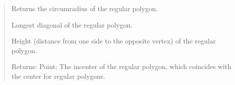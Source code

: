 \documentclass[letterpaper,10pt,english]{sphinxmanual}
\begin{document}
\begin{quote}
\begin{fulllineitems}
\begin{fulllineitems}
\end{fulllineitems}


\begin{fulllineitems}
\label{\detokenize{pygeox:pygeox.custom_objects.RegularPolygon.circumradius}}
\pysigstartsignatures
\pysigline
{}
\pysigstopsignatures
\sphinxAtStartPar
Returns the circumradius of the regular polygon.

\end{fulllineitems}


\begin{fulllineitems}
\label{\detokenize{pygeox:pygeox.custom_objects.RegularPolygon.diagonal}}
\pysigstartsignatures
\pysigline
{}
\pysigstopsignatures
\sphinxAtStartPar
Longest diagonal of the regular polygon.

\end{fulllineitems}


\begin{fulllineitems}
\label{\detokenize{pygeox:pygeox.custom_objects.RegularPolygon.height}}
\pysigstartsignatures
\pysigline
{}
\pysigstopsignatures
\sphinxAtStartPar
Height (distance from one side to the opposite vertex) of the regular polygon.

\end{fulllineitems}


\begin{fulllineitems}
\label{\detokenize{pygeox:pygeox.custom_objects.RegularPolygon.incenter}}
\pysigstartsignatures
\pysigline
{}
\pysigstopsignatures
\sphinxAtStartPar
Returns:
Point: The incenter of the regular polygon, which coincides with the center for regular polygons.


\end{fulllineitems}
\end{fulllineitems}
\end{quote}
\end{document}
